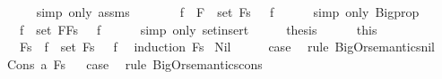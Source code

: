 \begin{isabellebody}
\ \ \ \ \isamarkupfalse%
\ {\isacharparenleft}simp\ only{\isacharcolon}\ assms{\isacharparenright}\isanewline
\ \ \isamarkupfalse%
\ \isamarkupfalse%
\ {\isachardoublequoteopen}{\isasymdots}\ {\isacharequal}\ {\isacharparenleft}{\isasymexists}f\ {\isasymin}\ {\isacharparenleft}{\isacharbraceleft}F{\isacharbraceright}\ {\isasymunion}\ set\ Fs{\isacharparenright}{\isachardot}\ {\isasymA}\ {\isasymTurnstile}\ f{\isacharparenright}{\isachardoublequoteclose}\isanewline
\ \ \ \ \isamarkupfalse%
\ {\isacharparenleft}simp\ only{\isacharcolon}\ Bigprop{}{\isacharparenright}\isanewline
\ \ \isamarkupfalse%
\ \isamarkupfalse%
\ {\isachardoublequoteopen}{\isasymdots}\ {\isacharequal}\ {\isacharparenleft}{\isasymexists}f\ {\isasymin}\ set\ {\isacharparenleft}F{\isacharhash}Fs{\isacharparenright}{\isachardot}\ {\isasymA}\ {\isasymTurnstile}\ f{\isacharparenright}{\isachardoublequoteclose}\isanewline
\ \ \ \ \isamarkupfalse%
\ {\isacharparenleft}simp\ only{\isacharcolon}\ set{\isacharunderscore}insert{\isacharparenright}\isanewline
\ \ \isamarkupfalse%
\ \isamarkupfalse%
\ {\isacharquery}thesis\isanewline
\ \ \ \ \isamarkupfalse%
\ this\isanewline
{}\isamarkupfalse%
%
\endisatagproof
{\isafoldproof}%
%
\isadelimproof
\isanewline
%
\endisadelimproof
\isanewline
{}\isamarkupfalse%
\ {\isachardoublequoteopen}{\isacharparenleft}{\isasymA}\ {\isasymTurnstile}\ \isactrlbold {\isasymOr}Fs{\isacharparenright}\ {\isasymlongleftrightarrow}\ {\isacharparenleft}{\isasymexists}f\ {\isasymin}\ set\ Fs{\isachardot}\ {\isasymA}\ {\isasymTurnstile}\ f{\isacharparenright}{\isachardoublequoteclose}\ \isanewline
%
\isadelimproof
%
\endisadelimproof
%
\isatagproof
{}\isamarkupfalse%
\ {\isacharparenleft}induction\ Fs{\isacharparenright}\isanewline
{}\isamarkupfalse%
\ Nil\isanewline
\ \ \isamarkupfalse%
\ \isamarkupfalse%
\ {\isacharquery}case\ \isamarkupfalse%
\ {\isacharparenleft}rule\ BigOr{\isacharunderscore}semantics{\isacharunderscore}nil{\isacharparenright}\isanewline
{}\isamarkupfalse%
\isanewline
\ \ \isamarkupfalse%
\ {\isacharparenleft}Cons\ a\ Fs{\isacharparenright}\isanewline
{}\isamarkupfalse%
\ \isamarkupfalse%
\ {\isacharquery}case\ \isamarkupfalse%
\ {\isacharparenleft}rule\ BigOr{\isacharunderscore}semantics{\isacharunderscore}cons{\isacharparenright}\isanewline

\end{isabellebody}
